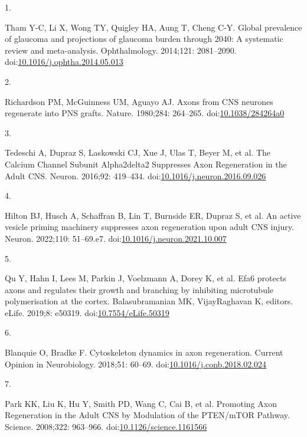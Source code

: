 \documentclass[
  12pt,
  a4paper,
]{article}
\newlength{\cslhangindent}
\newlength{\csllabelwidth}
\newlength{\cslentryspacingunit} %
\newenvironment{CSLReferences}[2] %
 {%
  \setlength{\parindent}{0pt}
  \ifodd #1
  \let\oldpar\par
  \def\par{\hangindent=\cslhangindent\oldpar}
  \fi
  \setlength{\parskip}{#2\cslentryspacingunit}
 }%
 {}
\newcommand{\CSLLeftMargin}[1]{\parbox[t]{\csllabelwidth}{#1}}
\newcommand{\CSLRightInline}[1]{\parbox[t]{\linewidth - \csllabelwidth}{#1}\break}
\begin{document}
\hypertarget{refs}{}
\begin{CSLReferences}{0}{0}
\leavevmode{}%
\CSLLeftMargin{1. }%
\CSLRightInline{Tham Y-C, Li X, Wong TY, Quigley HA, Aung T, Cheng C-Y.
Global prevalence of glaucoma and projections of glaucoma burden through
2040: A systematic review and meta-analysis. Ophthalmology. 2014;121:
2081--2090.
doi:\href{https://doi.org/10.1016/j.ophtha.2014.05.013}{10.1016/j.ophtha.2014.05.013}}

\leavevmode{}%
\CSLLeftMargin{2. }%
\CSLRightInline{Richardson PM, McGuinness UM, Aguayo AJ. Axons from
{CNS} neurones regenerate into {PNS} grafts. Nature. 1980;284: 264--265.
doi:\href{https://doi.org/10.1038/284264a0}{10.1038/284264a0}}

\leavevmode{}%
\CSLLeftMargin{3. }%
\CSLRightInline{Tedeschi A, Dupraz S, Laskowski CJ, Xue J, Ulas T, Beyer
M, et al. The {Calcium Channel Subunit Alpha2delta2 Suppresses Axon
Regeneration} in the {Adult CNS}. Neuron. 2016;92: 419--434.
doi:\href{https://doi.org/10.1016/j.neuron.2016.09.026}{10.1016/j.neuron.2016.09.026}}

\leavevmode{}%
\CSLLeftMargin{4. }%
\CSLRightInline{Hilton BJ, Husch A, Schaffran B, Lin T, Burnside ER,
Dupraz S, et al. An active vesicle priming machinery suppresses axon
regeneration upon adult {CNS} injury. Neuron. 2022;110: 51--69.e7.
doi:\href{https://doi.org/10.1016/j.neuron.2021.10.007}{10.1016/j.neuron.2021.10.007}}

\leavevmode{}%
\CSLLeftMargin{5. }%
\CSLRightInline{Qu Y, Hahn I, Lees M, Parkin J, Voelzmann A, Dorey K, et
al. Efa6 protects axons and regulates their growth and branching by
inhibiting microtubule polymerisation at the cortex. Balasubramanian MK,
VijayRaghavan K, editors. eLife. 2019;8: e50319.
doi:\href{https://doi.org/10.7554/eLife.50319}{10.7554/eLife.50319}}

\leavevmode{}%
\CSLLeftMargin{6. }%
\CSLRightInline{Blanquie O, Bradke F. Cytoskeleton dynamics in axon
regeneration. Current Opinion in Neurobiology. 2018;51: 60--69.
doi:\href{https://doi.org/10.1016/j.conb.2018.02.024}{10.1016/j.conb.2018.02.024}}

\leavevmode{}%
\CSLLeftMargin{7. }%
\CSLRightInline{Park KK, Liu K, Hu Y, Smith PD, Wang C, Cai B, et al.
Promoting {Axon Regeneration} in the {Adult CNS} by {Modulation} of the
{PTEN}/{mTOR Pathway}. Science. 2008;322: 963--966.
doi:\href{https://doi.org/10.1126/science.1161566}{10.1126/science.1161566}}


\end{CSLReferences}
\end{document}
